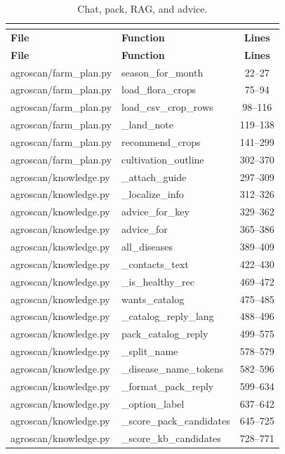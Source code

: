 \begin{center}
\footnotesize
\begin{longtable}{@{}p{4.6cm}p{5.2cm}c@{}}
\caption{Chat, pack, RAG, and advice.}\\
\label{tab:pychat}\\
\toprule
\textbf{File} & \textbf{Function} & \textbf{Lines} \\
\midrule
\endfirsthead
\toprule
\textbf{File} & \textbf{Function} & \textbf{Lines} \\
\midrule
\endhead
agroscan/farm\_plan.py & season\_for\_month & 22--27 \\
agroscan/farm\_plan.py & load\_flora\_crops & 75--94 \\
agroscan/farm\_plan.py & load\_csv\_crop\_rows & 98--116 \\
agroscan/farm\_plan.py & \_land\_note & 119--138 \\
agroscan/farm\_plan.py & recommend\_crops & 141--299 \\
agroscan/farm\_plan.py & cultivation\_outline & 302--370 \\
agroscan/knowledge.py & \_attach\_guide & 297--309 \\
agroscan/knowledge.py & \_localize\_info & 312--326 \\
agroscan/knowledge.py & advice\_for\_key & 329--362 \\
agroscan/knowledge.py & advice\_for & 365--386 \\
agroscan/knowledge.py & all\_diseases & 389--409 \\
agroscan/knowledge.py & \_contacts\_text & 422--430 \\
agroscan/knowledge.py & \_is\_healthy\_rec & 469--472 \\
agroscan/knowledge.py & wants\_catalog & 475--485 \\
agroscan/knowledge.py & \_catalog\_reply\_lang & 488--496 \\
agroscan/knowledge.py & pack\_catalog\_reply & 499--575 \\
agroscan/knowledge.py & \_split\_name & 578--579 \\
agroscan/knowledge.py & \_disease\_name\_tokens & 582--596 \\
agroscan/knowledge.py & \_format\_pack\_reply & 599--634 \\
agroscan/knowledge.py & \_option\_label & 637--642 \\
agroscan/knowledge.py & \_score\_pack\_candidates & 645--725 \\
agroscan/knowledge.py & \_score\_kb\_candidates & 728--771 \\

\end{longtable}
\end{center}
